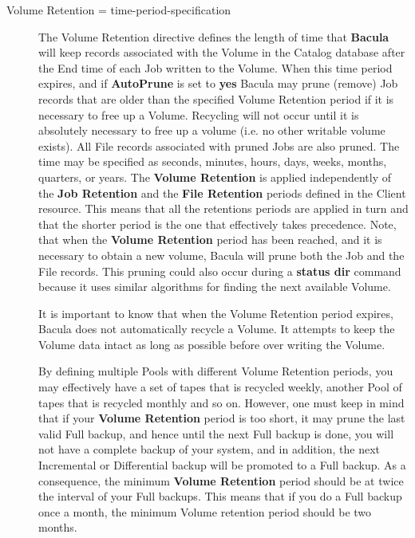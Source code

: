 \begin{description}
\label{VolRetention}
\item [Volume Retention = \lt{}time-period-specification\gt{}]
   The Volume Retention directive defines the length of time that {\bf
   Bacula} will keep records associated with the Volume in
   the Catalog database after the End time of each Job written to the
   Volume.  When this time period expires, and if {\bf AutoPrune} is set to
   {\bf yes} Bacula may prune (remove) Job records that are older than the
   specified Volume Retention period if it is necessary to free up a
   Volume.  Recycling will not occur until it is absolutely necessary to
   free up a volume (i.e. no other writable volume exists).
   All File records associated with pruned Jobs are also
   pruned.  The time may be specified as seconds, minutes, hours, days,
   weeks, months, quarters, or years.  The {\bf Volume Retention} is
   applied independently of the {\bf Job Retention} and the {\bf File
   Retention} periods defined in the Client resource.  This means that all
   the retentions periods are applied in turn and that the shorter period
   is the one that effectively takes precedence.  Note, that when the {\bf
   Volume Retention} period has been reached, and it is necessary to obtain
   a new volume, Bacula will prune both the Job and the File records.  This
   pruning could also occur during a {\bf status dir} command because it
   uses similar algorithms for finding the next available Volume.

   It is important to know that when the Volume Retention period expires, 
   Bacula does not automatically recycle a Volume. It attempts to keep the
   Volume data intact as long as possible before over writing the Volume.
   
   By defining multiple Pools with different Volume Retention periods, you
   may effectively have a set of tapes that is recycled weekly, another
   Pool of tapes that is recycled monthly and so on.  However, one must
   keep in mind that if your {\bf Volume Retention} period is too short, it
   may prune the last valid Full backup, and hence until the next Full
   backup is done, you will not have a complete backup of your system, and
   in addition, the next Incremental or Differential backup will be
   promoted to a Full backup.  As a consequence, the minimum {\bf Volume
   Retention} period should be at twice the interval of your Full backups.
   This means that if you do a Full backup once a month, the minimum Volume
   retention period should be two months.
   

\end{description}

